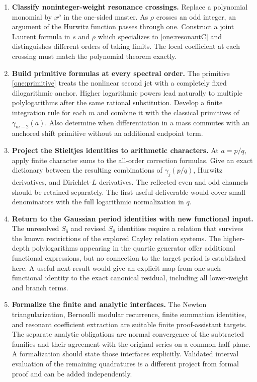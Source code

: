 \begin{enumerate}[leftmargin=*,label=\textbf{R\arabic*.}]
\item \textbf{Classify noninteger-weight resonance crossings.}
Replace a polynomial monomial by $x^\rho$ in the one-sided master.
As $\rho$ crosses an odd integer, an argument of the Hurwitz function
passes through one.  Construct a joint Laurent formula in $s$ and
$\rho$ which specializes to \eqref{one:resonantC} and distinguishes
different orders of taking limits.  The local coefficient at each
crossing must match the polynomial theorem exactly.

\item \textbf{Build primitive formulas at every spectral order.}
The primitive \eqref{one:primitive} treats the nonlinear second jet
with a completely fixed dilogarithmic anchor.  Higher logarithmic
powers lead naturally to multiple polylogarithms after the same
rational substitution.  Develop a finite integration rule for each
$m$ and combine it with the classical primitives of
$\gamma_{m-2}(a)$.  Also determine when differentiation in a mass
commutes with an anchored shift primitive without an additional
endpoint term.

\item \textbf{Project the Stieltjes identities to arithmetic characters.}
At $a=p/q$, apply finite character sums to the all-order correction
formulas.  Give an exact dictionary between the resulting combinations
of $\gamma_j(p/q)$, Hurwitz derivatives, and Dirichlet-$L$ derivatives.
The reflected even and odd channels should be retained separately.
The first useful deliverable would cover small denominators with
the full logarithmic normalization in $q$.

\item \textbf{Return to the Gaussian period identities with new functional input.}
The unresolved $S_6$ and revised $S_8$ identities require a relation
that survives the known restrictions of the explored Cayley relation
systems.  The higher-depth polylogarithms appearing in the quartic
generator offer additional functional expressions, but no connection
to the target period is established here.  A useful next result would
give an explicit map from one such functional identity to the exact
canonical residual, including all lower-weight and branch terms.

\item \textbf{Formalize the finite and analytic interfaces.}
The Newton triangularization, Bernoulli modular recurrence, finite
summation identities, and resonant coefficient extraction are suitable
finite proof-assistant targets.  The separate analytic obligations are
normal convergence of the subtracted families and their agreement
with the original series on a common half-plane.  A formalization
should state those interfaces explicitly.  Validated interval
evaluation of the remaining quadratures is a different project from
formal proof and can be added independently.
\end{enumerate}

